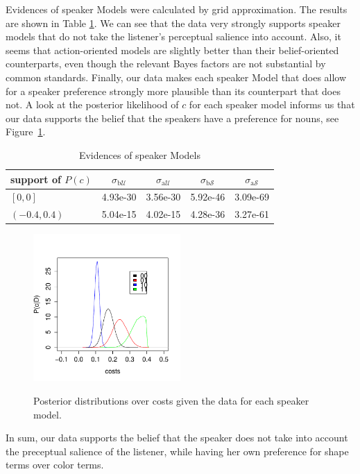 Evidences of speaker Models were calculated by grid approximation. The
results are shown in Table \ref{table:speaker mod}. We can see
 that the data very strongly supports
speaker models that do not take the listener's perceptual salience
into account. Also, it seems that action-oriented models are slightly
better than their belief-oriented counterparts, even though the
relevant Bayes factors are not substantial by common
standards. Finally, our data makes each speaker Model that does allow
for a speaker preference strongly more plausible than its
counterpart that does not. A look at the posterior likelihood of $c$
for each speaker model informs us that our data supports the belief
that the speakers have a preference for nouns, see
Figure~\ref{fig:cost_post_s}. 
%
\begin{table}[htb] 
  \centering 
  \caption{Evidences of speaker Models}
  \begin{tabular}{lcccc}
    support of $P(c)$ 
    & $\sigma_{\mathrm{b}\mathcal{U}}$
    & $\sigma_{\mathrm{a}\mathcal{U}}$
    & $\sigma_{\mathrm{b}\mathcal{S}}$
    & $\sigma_{\mathrm{a}\mathcal{S}}$
    \\ \midrule
    $[0,0]$
    & 4.93e-30
    & 3.56e-30
    & 5.92e-46
    & 3.09e-69
    \\
    $(-0.4,0.4)$
    & 5.04e-15
    & 4.02e-15
    & 4.28e-36
    & 3.27e-61
  \end{tabular} 
  \label{table:speaker mod}
\end{table}
%
\begin{figure}[htb]
  \centering
  \caption{Posterior distributions over costs given the data for each
    speaker model.}
  \includegraphics[width=0.5\textwidth]{pics/cost_post_s.pdf}
  \label{fig:cost_post_s}
\end{figure}
%
In sum, our data supports the belief that the speaker does not take
into account the preceptual salience of the listener, while having her
own preference for shape terms over color terms.


